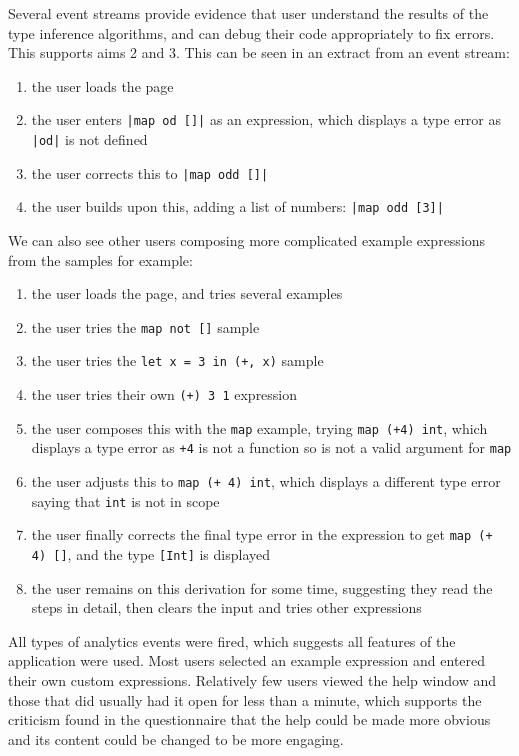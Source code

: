 \documentclass[a4paper,fleqn,oneside,12pt]{report}
\begin{document}
Several event streams provide evidence that user understand the results of the type inference algorithms, and can debug their code appropriately to fix errors. This supports aims 2 and 3. This can be seen in an extract from an event stream:
\begin{enumerate}
  \item the user loads the page
  \item the user enters \texttt{|map od []|} as an expression, which displays a type error as \texttt{|od|} is not defined
  \item the user corrects this to \texttt{|map odd []|}
  \item the user builds upon this, adding a list of numbers: \texttt{|map odd [3]|}
\end{enumerate}

We can also see other users composing more complicated example expressions from the samples for example:
\begin{enumerate}
  \item the user loads the page, and tries several examples
  \item the user tries the \texttt{map not []} sample
  \item the user tries the \texttt{let x = 3 in (+, x)} sample
  \item the user tries their own \texttt{(+) 3 1} expression
  \item the user composes this with the \texttt{map} example, trying \texttt{map (+4) int}, which displays a type error as \texttt{+4} is not a function so is not a valid argument for \texttt{map}
  \item the user adjusts this to \texttt{map (+ 4) int}, which displays a different type error saying that \texttt{int} is not in scope
  \item the user finally corrects the final type error in the expression to get \texttt{map (+ 4) []}, and the type \texttt{[Int]} is displayed
  \item the user remains on this derivation for some time, suggesting they read the steps in detail, then clears the input and tries other expressions
\end{enumerate}

All types of analytics events were fired, which suggests all features of the application were used. Most users selected an example expression and entered their own custom expressions. Relatively few users viewed the help window and those that did usually had it open for less than a minute, which supports the criticism found in the questionnaire that the help could be made more obvious and its content could be changed to be more engaging.
\end{document}
